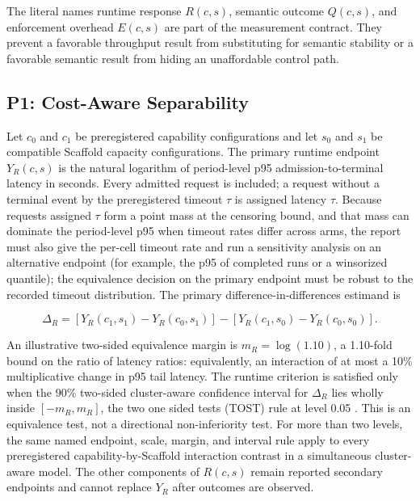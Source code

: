 \documentclass[11pt]{article}
\begin{document}
The literal names runtime response $R(c,s)$, semantic outcome $Q(c,s)$, and enforcement overhead $E(c,s)$ are part of the measurement contract. They prevent a favorable throughput result from substituting for semantic stability or a favorable semantic result from hiding an unaffordable control path.

\subsection{P1: Cost-Aware Separability}
\label{sec:p1}

Let $c_0$ and $c_1$ be preregistered capability configurations and let $s_0$ and $s_1$ be compatible Scaffold capacity configurations. The primary runtime endpoint $Y_R(c,s)$ is the natural logarithm of period-level p95 admission-to-terminal latency in seconds. Every admitted request is included; a request without a terminal event by the preregistered timeout $\tau$ is assigned latency $\tau$. Because requests assigned $\tau$ form a point mass at the censoring bound, and that mass can dominate the period-level p95 when timeout rates differ across arms, the report must also give the per-cell timeout rate and run a sensitivity analysis on an alternative endpoint (for example, the p95 of completed runs or a winsorized quantile); the equivalence decision on the primary endpoint must be robust to the recorded timeout distribution. The primary difference-in-differences estimand is

\begin{equation}
\Delta_R =
[Y_R(c_1,s_1)-Y_R(c_0,s_1)]
-[Y_R(c_1,s_0)-Y_R(c_0,s_0)].
\end{equation}

An illustrative two-sided equivalence margin is $m_R=\log(1.10)$, a 1.10-fold bound on the ratio of latency ratios: equivalently, an interaction of at most a 10\% multiplicative change in p95 tail latency. The runtime criterion is satisfied only when the 90\% two-sided cluster-aware confidence interval for $\Delta_R$ lies wholly inside $[-m_R,m_R]$, the two one sided tests (TOST) rule at level 0.05 \cite{schuirmann1987tost}. This is an equivalence test, not a directional non-inferiority test. For more than two levels, the same named endpoint, scale, margin, and interval rule apply to every preregistered capability-by-Scaffold interaction contrast in a simultaneous cluster-aware model. The other components of $R(c,s)$ remain reported secondary endpoints and cannot replace $Y_R$ after outcomes are observed.
\end{document}
